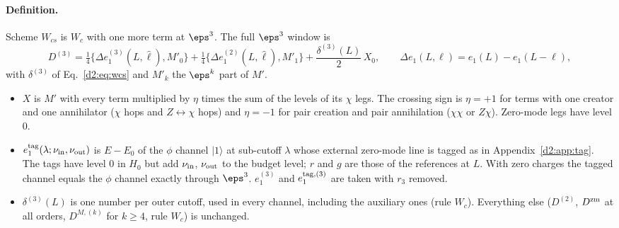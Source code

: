 \paragraph{Definition.} Scheme $W_{cs}$ is $W_c$ with one more term at $\eps^3$. The full $\eps^3$ window is
\begin{equation}
 D^{(3)}=\tfrac14\big\{\Delta e_1^{(3)}(L,\hat\ell),M'_0\big\}+\tfrac14\big\{\Delta e_1^{(2)}(L,\hat\ell),M'_1\big\}+\frac{\delta^{(3)}(L)}2\,X_0,
 \qquad \Delta e_1(L,\ell)=e_1(L)-e_1(L-\ell),
 \label{d2:eq:wcsfull}
\end{equation}
with $\delta^{(3)}$ of Eq.~\eqref{d2:eq:wcs} and $M'_k$ the $\eps^k$ part of $M'$.
\begin{itemize}
\item $X$ is $M'$ with every term multiplied by $\eta$ times the sum of the levels of its $\chi$ legs. The crossing sign is
 $\eta=+1$ for terms with one creator and one annihilator ($\chi$ hops and $Z\leftrightarrow\chi$ hops) and $\eta=-1$ for pair
 creation and pair annihilation ($\chi\chi$ or $Z\chi$). Zero-mode legs have level 0.
\item $e_1^{\rm tag}(\lambda;\nu_{\rm in},\nu_{\rm out})$ is $E-E_0$ of the $\phi$ channel $|1\rangle$ at sub-cutoff $\lambda$
 whose external zero-mode line is tagged as in Appendix~\ref{d2:app:tag}. The tags have level 0 in $H_0$ but add
 $\nu_{\rm in}$, $\nu_{\rm out}$ to the budget level; $r$ and $g$ are those of the references at $L$. With zero charges the
 tagged channel equals the $\phi$ channel exactly through $\eps^3$. $e_1^{(3)}$ and $e_1^{{\rm tag},(3)}$ are taken with $r_3$
 removed.
\item $\delta^{(3)}(L)$ is one number per outer cutoff, used in every channel, including the auxiliary ones (rule $W_c$).
 Everything else ($D^{(2)}$, $D^{\rm zm}$ at all orders, $D^{M,(k)}$ for $k\ge4$, rule $W_c$) is unchanged.
\end{itemize}

